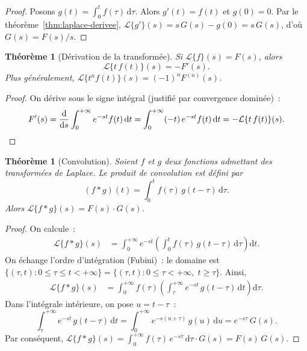 \documentclass[12pt,a4paper,openany]{book}
\theoremstyle{definition}
\theoremstyle{plain}
\newtheorem{theoreme}[definition]{Théorème}
\theoremstyle{remark}
\newcommand{\dd}{\mathrm{d}}
\begin{document}
\begin{proof}
  Posons $g(t)=\int_0^t f(\tau)\,\dd\tau$. Alors $g'(t)=f(t)$ et
  $g(0)=0$. Par le théorème~\ref{thm:laplace-derivee},
  $\mathcal{L}\{g'\}(s)=s\,G(s)-g(0)=s\,G(s)$, d'où
  $G(s)=F(s)/s$.
\end{proof}

\begin{theoreme}[Dérivation de la transformée]\label{thm:deriv-F}
  Si $\mathcal{L}\{f\}(s)=F(s)$, alors
  \[
    \mathcal{L}\{t\,f(t)\}(s) = -F'(s).
  \]
  Plus généralement, $\mathcal{L}\{t^n f(t)\}(s)=(-1)^n F^{(n)}(s)$.
\end{theoreme}

\begin{proof}
  On dérive sous le signe intégral (justifié par convergence dominée)~:
  \[
    F'(s) = \frac{\dd}{\dd s}\int_0^{+\infty}e^{-st}f(t)\,\dd t
    = \int_0^{+\infty}(-t)\,e^{-st}f(t)\,\dd t
    = -\mathcal{L}\{t\,f(t)\}(s).
    \qedhere
  \]
\end{proof}

\begin{theoreme}[Convolution]\label{thm:convolution}
  Soient $f$ et $g$ deux fonctions admettant des transformées de
  Laplace. Le \emph{produit de convolution} est défini par
  \[
    (f*g)(t) = \int_0^t f(\tau)\,g(t-\tau)\,\dd\tau.
  \]
  Alors $\mathcal{L}\{f*g\}(s)=F(s)\cdot G(s)$.
\end{theoreme}

\begin{proof}
  On calcule~:
  \begin{align*}
    \mathcal{L}\{f*g\}(s)
    &= \int_0^{+\infty}e^{-st}\left(\int_0^t f(\tau)\,g(t-\tau)\,\dd\tau\right)\dd t.
  \end{align*}
  On échange l'ordre d'intégration (Fubini)~: le domaine est
  $\{(\tau,t):0\leq\tau\leq t<+\infty\}=\{(\tau,t):0\leq\tau<+\infty,\;t\geq\tau\}$.
  Ainsi,
  \begin{align*}
    \mathcal{L}\{f*g\}(s)
    &= \int_0^{+\infty}f(\tau)\left(\int_\tau^{+\infty}e^{-st}\,g(t-\tau)\,\dd t\right)\dd\tau.
  \end{align*}
  Dans l'intégrale intérieure, on pose $u=t-\tau$~:
  \[
    \int_\tau^{+\infty}e^{-st}\,g(t-\tau)\,\dd t
    = \int_0^{+\infty}e^{-s(u+\tau)}\,g(u)\,\dd u
    = e^{-s\tau}\,G(s).
  \]
  Par conséquent,
  $\mathcal{L}\{f*g\}(s)
  = \int_0^{+\infty}f(\tau)\,e^{-s\tau}\,\dd\tau\cdot G(s)
  = F(s)\,G(s)$.
\end{proof}
\end{document}
